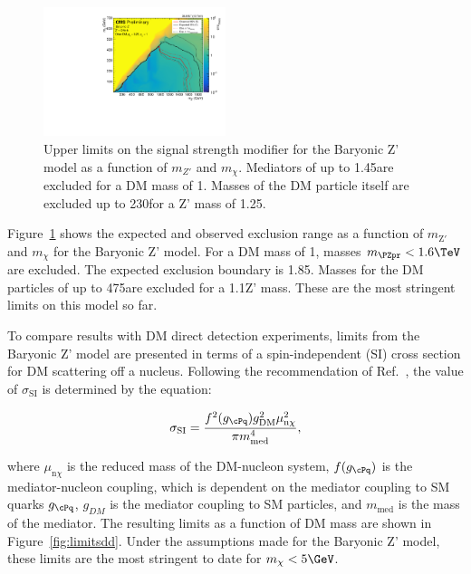 \begin{figure}[htbp]
  \centering
  \includegraphics[width=0.475\textwidth]{figures/limits/limit2d_zpb_bb_approval_prelim.pdf}
  \caption{Upper limits on the signal strength modifier for the Baryonic Z' model  as a function of $m_{Z'}$ and $m_\chi$. Mediators of up to 1.45\TeV are excluded for a DM mass of 1\GeV. Masses of the DM particle itself are excluded up to 230\GeV for a Z' mass of 1.25\TeV.}
  \label{fig:limits}
\end{figure}




Figure~\ref{fig:limits} shows the expected and observed exclusion range as a function of $m_{\text{Z}'}$ and $m_{\chi}$ for the Baryonic Z' model. For a DM mass of 1\GeV, masses $\mzp<1.6\TeV$ are excluded. The expected exclusion boundary is 1.85\TeV. Masses for the DM particles of up to 475\GeV are excluded for a 1.1\TeV Z' mass. These are the most stringent limits on this model so far. %

To compare results with DM direct detection experiments, limits from the Baryonic Z' model are presented in terms of a spin-independent (SI) cross section \SigSI for DM scattering off a nucleus.
Following the recommendation of Ref.~\cite{presentDM}, the value of $\sigma_\text{SI}$ is determined by the equation:

\begin{equation}
\sigma_\text{SI} = \frac{f^2(g_{\cPq})g^2_{\mathrm{DM}}\mu^2_{\mathrm{n}\chi}}{\pi m^4_{\mathrm{med}}},
\end{equation}

where $\mu_{\mathrm{n}\chi}$ is the reduced mass of the DM-nucleon system, $f(g_{\cPq})$ is the mediator-nucleon coupling, which is dependent on the mediator coupling to SM quarks $g_{\cPq}$, $g_{DM}$ is the mediator coupling to SM particles, and $m_{\text{med}}$ is the mass of the mediator.
The resulting \SigSI limits as a function of DM mass are shown in Figure~\ref{fig:limitsdd}.
Under the assumptions made for the Baryonic Z' model, these limits are the most stringent to date for $m_\chi < 5\GeV$.


